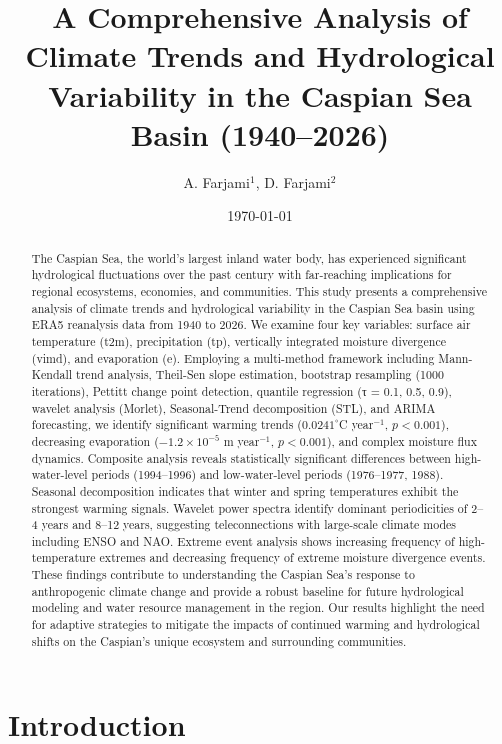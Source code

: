 \documentclass[12pt,a4paper]{article}
\title{A Comprehensive Analysis of Climate Trends and Hydrological Variability in the Caspian Sea Basin (1940–2026)}
\author{A. Farjami$^{1}$, D. Farjami$^{2}$}
\affiliation{$^1$Department of Climatology, University of Tehran, Iran\\
$^2$Department of Hydrology, University of Tehran, Iran}
\date{\today}
\begin{document}
\maketitle

\begin{abstract}
The Caspian Sea, the world's largest inland water body, has experienced significant hydrological fluctuations over the past century with far-reaching implications for regional ecosystems, economies, and communities. This study presents a comprehensive analysis of climate trends and hydrological variability in the Caspian Sea basin using ERA5 reanalysis data from 1940 to 2026. We examine four key variables: surface air temperature (t2m), precipitation (tp), vertically integrated moisture divergence (vimd), and evaporation (e). Employing a multi-method framework including Mann-Kendall trend analysis, Theil-Sen slope estimation, bootstrap resampling (1000 iterations), Pettitt change point detection, quantile regression (τ = 0.1, 0.5, 0.9), wavelet analysis (Morlet), Seasonal-Trend decomposition (STL), and ARIMA forecasting, we identify significant warming trends ($0.0241^\circ$C year$^{-1}$, $p < 0.001$), decreasing evaporation ($-1.2 \times 10^{-5}$ m year$^{-1}$, $p < 0.001$), and complex moisture flux dynamics. Composite analysis reveals statistically significant differences between high-water-level periods (1994–1996) and low-water-level periods (1976–1977, 1988). Seasonal decomposition indicates that winter and spring temperatures exhibit the strongest warming signals. Wavelet power spectra identify dominant periodicities of 2–4 years and 8–12 years, suggesting teleconnections with large-scale climate modes including ENSO and NAO. Extreme event analysis shows increasing frequency of high-temperature extremes and decreasing frequency of extreme moisture divergence events. These findings contribute to understanding the Caspian Sea's response to anthropogenic climate change and provide a robust baseline for future hydrological modeling and water resource management in the region. Our results highlight the need for adaptive strategies to mitigate the impacts of continued warming and hydrological shifts on the Caspian's unique ecosystem and surrounding communities.
\end{abstract}

\section{Introduction}
\end{document}
